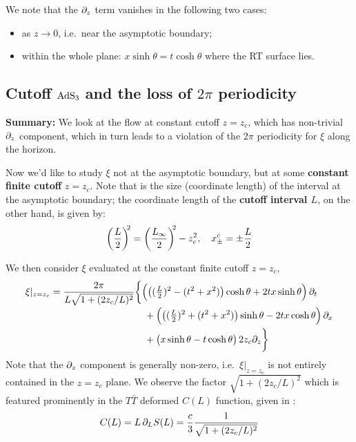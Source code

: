 \documentclass[11pt,a4paper]{article}
\begin{document}
	We note that the $\partial_{z}$ term vanishes in the following two cases:
	\begin{itemize}[noitemsep]
	\item as $z\to 0$, i.e.~near the asymptotic boundary;
	\item within the whole plane: $
			x\sinh\theta
			= t\cosh\theta
		$ where the RT surface lies. 
	\end{itemize}
	
\FloatBarrier
\pagebreak
\subsection{Cutoff $\mathrm{AdS}_3$ and the loss of $2\pi$ periodicity}

\textbf{Summary:} We look at the flow at constant cutoff $z = z_c$, which has non-trivial $\partial_{z}$ component, which in turn leads to a violation of the $2\pi$ periodicity for $\xi$ along the horizon.
	
	Now we'd like to study $\xi$ not at the asymptotic boundary, but at some \textbf{constant finite cutoff} $z = z_c$. 
	Note that is the size (coordinate length) of the interval at the {asymptotic boundary}; the coordinate length of the \textbf{cutoff interval $L$}, on the other hand, is given by:
	\begin{equation}
		\pqty{\frac{L}{2}}^{\!\!2}
		= \pqty{\frac{L_\infty}{2}}^{\!\!2} - z_c^2,
	\quad
		x_\pm^c
		= \pm \frac{L}{2}
	\label{eq:length_relations}
	\end{equation}
	
	We then consider $\xi$ evaluated at the {constant finite cutoff} $z = z_c$,
	\begin{equation}
	\begin{aligned}
		\xi|_{z=z_c}
		= \frac{2\pi}{
				L\sqrt{1 + (2z_c/L)^2}
			}
		& \bigg\{
			\pqty\Big{
				\pqty{
					(\tfrac{L}{2})^2
					- (t^2 + x^2)
				} \cosh\theta
				+ 2tx \sinh\theta
			} \,\pdd{t}
		\\[-.5ex] &\quad 
			+ \pqty\Big{
				\pqty{
					(\tfrac{L}{2})^2
					+ (t^2 + x^2)
				} \sinh\theta
				- 2tx \cosh\theta
			} \,\pdd{x}
		\\ &\quad 
			+ \pqty\big{
				x\sinh\theta
				- t\cosh\theta
			} \,2z_c\pdd{z}
		\bigg\}
	\end{aligned}
	\end{equation}
	Note that the $\partial_{z}$ component is generally non-zero, i.e.~$\xi|_{z=z_c}$ is not entirely contained in the $z = z_c$ plane. 
	We observe the factor $
		\sqrt{1 + (2z_c/L)^2}
	$ which is featured prominently in the $T\bar{T}$ deformed $C(L)$ function, given in \cite{Lewkowycz:2019xse}:
	\begin{equation}
		C(L) = L\,\partial_{L} S(L)
		= \frac{c}{3} 
			\frac{1}{
				\sqrt{1 + (2z_c/L)^2}
			}
	\end{equation}
	
\end{document}
